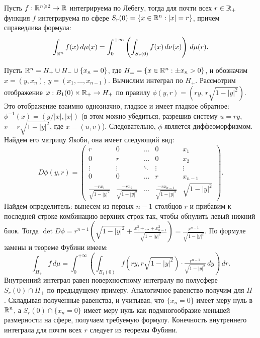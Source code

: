 \begin{theorem}
	Пусть $f : \mathbb{R}^{n \geqslant 2} \to \mathbb{R}$ интегрируема по Лебегу, тогда для почти всех $r \in \mathbb{R}_+$ функция $f$ интегрируема по сфере $S_r(0) = \{x \in \mathbb{R}^n : |x| = r\}$, причем справедлива формула:
	\[ \int_{\mathbb{R}^n} f(x) \, d\mu(x) = \int_0^{+\infty} \left( \int_{S_r(0)} f(x) \, d\nu (x) \right) \, d \mu(r). \]
\end{theorem}

\begin{myproof}
	Пусть $\mathbb{R}^n = H_+ \cup H_- \cup \{x_n = 0\}$, где $H_{\pm} = \{x \in \mathbb{R}^n : \pm x_n > 0\}$, и обозначим $x = (y, x_n)$, $y = (x_1, \dotsc, x_{n-1})$.
	Вычислим интеграл по $H_+$. 
	Рассмотрим отображение $\varphi : B_1(0) \times \mathbb{R}_+ \to H_+$ по правилу $\phi(y, r) = (ry, \, r \sqrt{1 - |y|^2})$.
	Это отображение взаимно однозначно, гладкое и имеет гладкое обратное: $\phi^{-1}(x) = (y/ |x|, |x|)$ (в этом можно убедиться, разрешив систему $u = ry$, $v = r \sqrt{1 - |y|^2}$, где $x = (u, v)$). 
	Следовательно, $\phi$ является диффеоморфизмом. 
	Найдем его матрицу Якоби, она имеет следующий вид: 
	\[ D \phi(y, r) = \left( \begin{array}{cccc|c}
		r & 0 & \dots & 0 & x_1 \\
		0 & r & \dots & 0 & x_2 \\
		\vdots & \vdots & \ddots & \vdots & \vdots \\
		0 & 0 & \dots & r & x_{n-1} \\
		\hline
		\frac{-r x_1}{\sqrt{1 - |y|^2}} & \frac{-r x_2}{\sqrt{1 - |y|^2}} & \dots & \frac{-r x_{n-1}}{\sqrt{1 - |y|^2}} & \sqrt{1 - |y|^2}
	\end{array} \right). \]
	Найдем определитель: вынесем из первых $n-1$ столбцов $r$ и прибавим к последней строке комбинацию верхних строк так, чтобы обнулить левый нижний блок. 
	Тогда $\det D \phi = r^{n-1} \left( \sqrt{1 - |y|^2} + \frac{x_1^2 + \dotsc + x^2_{n-1}}{\sqrt{1 - |y|^2}} \right) = \frac{r^{n-1}}{\sqrt{1 - |y|^2}}$.
	По формуле замены и теореме Фубини имеем: 
	\[ \int_{H_+} f \, d\mu = \int_{0}^{+\infty} \left( \int_{B_1(0)} f (ry, r \sqrt{1 - |y|^2}) \cdot \tfrac{r^{n-1}}{\sqrt{1 - |y|^2}} \, dy  \right) \, dr. \]
	Внутренний интеграл равен поверхностному интегралу по полусфере $S_r(0) \cap H_+$ по предыдущему примеру.
	Аналогичное равенство получим для $H_-$. Складывая полученные равенства, и учитывая, что $\{x_n = 0\}$ имеет меру нуль в $\mathbb{R}^n$, а $S_r(0) \cap \{x_n = 0\}$ имеет меру нуль как подмногообразие меньшей размерности на сфере, получаем требуемую формулу.
	Конечность внутреннего интеграла для почти всех $r$ следует из теоремы Фубини. 
\end{myproof}


